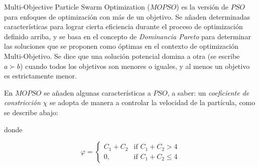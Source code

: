 Multi-Objective Particle Swarm Optimization ($MOPSO$) \cite{nebro2009smpso} es la versión de $PSO$ para enfoques de optimización con más de un objetivo. Se añaden determinadas características para lograr cierta eficiencia durante el proceso de optimización definido arriba, y se basa en el concepto de \textit{Dominancia Pareto}\cite{voorneveld2003characterization} para determinar las soluciones que se proponen como óptimas en el contexto de optimización Multi-Objetivo. Se dice que una solución potencial domina a otra (se escribe $a \succ b$) cuando todos los objetivos son menores o iguales, y al menos un objetivo es estrictamente menor.

En $MOPSO$ se añaden algunas características a $PSO$, a saber: un \textit{coeficiente de constricción} $\chi$\label{symbol:mopsoconstriccion1} se adopta de manera a controlar la velocidad de la partícula, como se describe abajo:








donde


\begin{equation}\label{symbol:varphi}
\varphi= 
\begin{cases}
C_1 + C_2 & \text{if } C_1 + C_2 > 4\\
0,              & \text{if } C_1 + C_2 \leq 4
\end{cases}
\end{equation}


